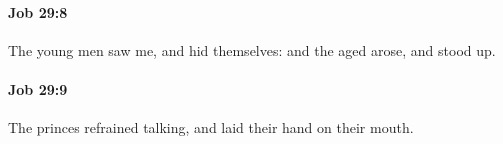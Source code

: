 		\paragraph{Job 29:8} %
			\label{JOB-29-8}

			The young men saw me, and hid themselves: and the aged arose, and stood up.


		\paragraph{Job 29:9} %
			\label{JOB-29-9}

			The princes refrained talking, and laid their hand on their mouth.


